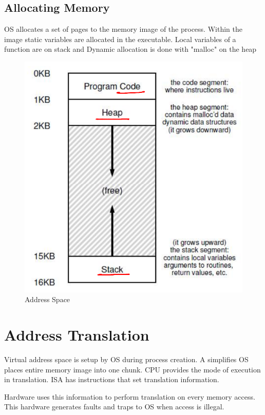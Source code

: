 \documentclass{article}
\begin{document}
\subsection{Allocating Memory}
OS allocates a set of pages to the memory image of the process. Within the image static variables are allocated in the executable. Local variables of a function are on stack and Dynamic allocation is done with "malloc" on the heap

    \begin{figure}[ht]
     \centering
     \includegraphics[scale = 0.6]{img/Address_Space.png}
     \caption{Address Space}
    \end{figure}
    
\section{Address Translation}
Virtual address space is setup by OS during process creation. A simplifies OS places entire memory image into one chunk. CPU provides the mode of execution in translation. ISA has instructions that set translation information. 

Hardware uses this information to perform translation on every memory access. This hardware generates faults and traps to OS when access is illegal.
\end{document}
